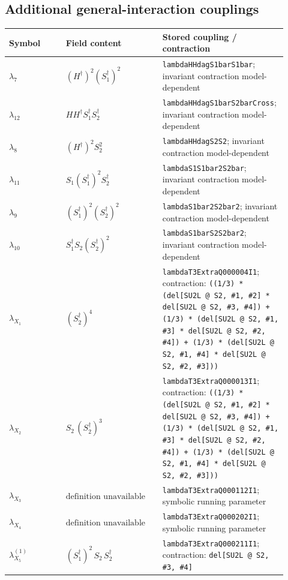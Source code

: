 \documentclass[8pt]{article}
\begin{document}
\begin{landscape}
\section*{Additional general-interaction couplings}
\begin{longtable}{@{}p{0.20\linewidth}p{0.34\linewidth}p{0.38\linewidth}@{}}
\toprule
Symbol & Field content & Stored coupling / contraction \\
\midrule
$\lambda_7$ & $(H^\dagger)^2(S_1^\dagger)^2$ & \texttt{lambdaHHdagS1barS1bar}; invariant contraction model-dependent \\
$\lambda_{12}$ & $HH^\dagger S_1^\dagger S_2^\dagger$ & \texttt{lambdaHHdagS1barS2barCross}; invariant contraction model-dependent \\
$\lambda_8$ & $(H^\dagger)^2S_2^2$ & \texttt{lambdaHHdagS2S2}; invariant contraction model-dependent \\
$\lambda_{11}$ & $S_1(S_1^\dagger)^2S_2^\dagger$ & \texttt{lambdaS1S1bar2S2bar}; invariant contraction model-dependent \\
$\lambda_9$ & $(S_1^\dagger)^2(S_2^\dagger)^2$ & \texttt{lambdaS1bar2S2bar2}; invariant contraction model-dependent \\
$\lambda_{10}$ & $S_1^\dagger S_2(S_2^\dagger)^2$ & \texttt{lambdaS1barS2S2bar2}; invariant contraction model-dependent \\
$\lambda_{X_{1}}$ & $(S_2^\dagger)^{4}$ & \texttt{lambdaT3ExtraQ000004I1}; contraction: \texttt{((1/3) * (del[SU2L @ S2, \#1, \#2] * del[SU2L @ S2, \#3, \#4]) + (1/3) * (del[SU2L @ S2, \#1, \#3] * del[SU2L @ S2, \#2, \#4]) + (1/3) * (del[SU2L @ S2, \#1, \#4] * del[SU2L @ S2, \#2, \#3]))} \\
$\lambda_{X_{2}}$ & $S_2\,(S_2^\dagger)^{3}$ & \texttt{lambdaT3ExtraQ000013I1}; contraction: \texttt{((1/3) * (del[SU2L @ S2, \#1, \#2] * del[SU2L @ S2, \#3, \#4]) + (1/3) * (del[SU2L @ S2, \#1, \#3] * del[SU2L @ S2, \#2, \#4]) + (1/3) * (del[SU2L @ S2, \#1, \#4] * del[SU2L @ S2, \#2, \#3]))} \\
$\lambda_{X_{3}}$ & $\text{definition unavailable in registry}$ & \texttt{lambdaT3ExtraQ000112I1}; symbolic running parameter \\
$\lambda_{X_{4}}$ & $\text{definition unavailable in registry}$ & \texttt{lambdaT3ExtraQ000202I1}; symbolic running parameter \\
$\lambda_{X_{5}}^{(1)}$ & $(S_1^\dagger)^{2}\,S_2\,S_2^\dagger$ & \texttt{lambdaT3ExtraQ000211I1}; contraction: \texttt{del[SU2L @ S2, \#3, \#4]} \\

\end{longtable}
\end{landscape}
\end{document}
